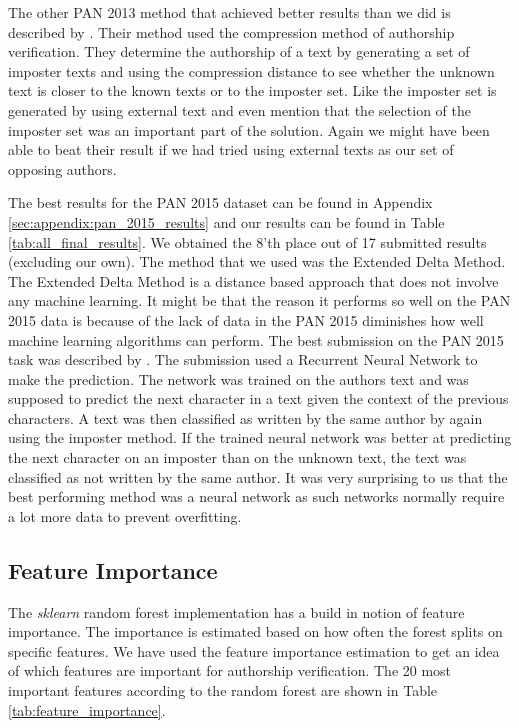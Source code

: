 The other PAN 2013 method that achieved better results than we did is described
by \cite{veenman:2013}. Their method used the compression method of authorship
verification. They determine the authorship of a text by generating a set
of imposter texts and using the compression distance to see whether the
unknown text is closer to the known texts or to the imposter set. Like
\cite{seidman:2013} the imposter set is generated by using external text and
\cite{veenman:2013} even mention that the selection of the imposter set was an
important part of the solution. Again we might have been able to beat their
result if we had tried using external texts as our set of opposing authors.

The best results for the PAN 2015 dataset can be found in Appendix
\ref{sec:appendix:pan_2015_results} and our results can be found in Table
\ref{tab:all_final_results}. We obtained the 8'th place out of 17 submitted
results (excluding our own). The method that we used was the Extended Delta
Method. The Extended Delta Method is a distance based approach that does not
involve any machine learning. It might be that the reason it performs so well
on the PAN 2015 data is because of the lack of data in the PAN 2015 diminishes
how well machine learning algorithms can perform. The best submission on the PAN
2015 task was described by \cite{bagnall:2015}. The submission used a Recurrent
Neural Network to make the prediction. The network was trained on the authors
text and was supposed to predict the next character in a text given the context
of the previous characters. A text was then classified as written by the same
author by again using the imposter method. If the trained neural network was
better at predicting the next character on an imposter than on the unknown
text, the text was classified as not written by the same author. It was very
surprising to us that the best performing method was a neural network as such
networks normally require a lot more data to prevent overfitting.

\subsection{Feature Importance}

The \textit{sklearn} random forest implementation has a build in notion of
feature importance. The importance is estimated based on how often the forest
splits on specific features. We have used the feature importance estimation to
get an idea of which features are important for authorship verification. The
20 most important features according to the random forest are shown in Table
\ref{tab:feature_importance}.


